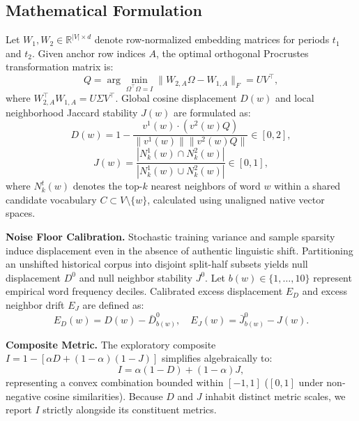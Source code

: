 \documentclass[conference]{IEEEtran}
\begin{document}
\subsection{Mathematical Formulation}
\label{sec:formulation}
Let $W_1, W_2 \in \mathbb{R}^{|V| \times d}$ denote row-normalized embedding matrices for periods $t_1$ and $t_2$. Given anchor row indices $A$, the optimal orthogonal Procrustes transformation matrix \cite{schonemann1966generalized} is:
\begin{equation}
Q = \arg\min_{\Omega^\top\Omega = I} \|W_{2,A}\Omega - W_{1,A}\|_F = UV^\top,
\label{eq:procrustes}
\end{equation}
where $W_{2,A}^\top W_{1,A} = U\Sigma V^\top$. Global cosine displacement $D(w)$ and local neighborhood Jaccard stability $J(w)$ are formulated as:
\begin{equation}
D(w) = 1 - \frac{v^1(w) \cdot (v^2(w)Q)}{\|v^1(w)\| \|v^2(w)Q\|} \in [0, 2],
\label{eq:displacement}
\end{equation}
\begin{equation}
J(w) = \frac{|N_k^1(w) \cap N_k^2(w)|}{|N_k^1(w) \cup N_k^2(w)|} \in [0, 1],
\label{eq:jaccard}
\end{equation}
where $N_k^t(w)$ denotes the top-$k$ nearest neighbors of word $w$ within a shared candidate vocabulary $C \subset V \setminus \{w\}$, calculated using unaligned native vector spaces.

\textbf{Noise Floor Calibration.} Stochastic training variance and sample sparsity induce displacement even in the absence of authentic linguistic shift. Partitioning an unshifted historical corpus into disjoint split-half subsets yields null displacement $D^0$ and null neighbor stability $J^0$. Let $b(w) \in \{1, \dots, 10\}$ represent empirical word frequency deciles. Calibrated excess displacement $E_D$ and excess neighbor drift $E_J$ are defined as:
\begin{equation}
E_D(w) = D(w) - \bar{D}_{b(w)}^0, \quad E_J(w) = \bar{J}_{b(w)}^0 - J(w).
\label{eq:excess}
\end{equation}

\textbf{Composite Metric.} The exploratory composite $I = 1 - [\alpha D + (1-\alpha)(1-J)]$ simplifies algebraically to:
\begin{equation}
I = \alpha(1-D) + (1-\alpha)J,
\label{eq:composite}
\end{equation}
representing a convex combination bounded within $[-1, 1]$ ($[0, 1]$ under non-negative cosine similarities). Because $D$ and $J$ inhabit distinct metric scales, we report $I$ strictly alongside its constituent metrics.
\end{document}

